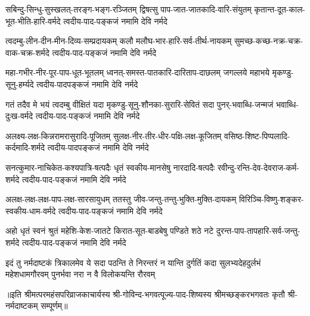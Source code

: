 
\fourlineindentedshloka
{सबिन्दु-सिन्धु-सुस्खलत्-तरङ्ग-भङ्ग-रञ्जितम्}
{द्विषत्सु पाप-जात-जातकादि-वारि-संयुतम्}
{कृतान्त-दूत-काल-भूत-भीति-हारि-वर्मदे}
{त्वदीय-पाद-पङ्कजं नमामि देवि नर्मदे} %

\fourlineindentedshloka
{त्वदम्बु-लीन-दीन-मीन-दिव्य-सम्प्रदायकम्}
{कलौ मलौघ-भार-हारि-सर्व-तीर्थ-नायकम्}
{सुमच्छ-कच्छ-नक्र-चक्र-वाक-चक्र-शर्मदे}
{त्वदीय-पाद-पङ्कजं नमामि देवि नर्मदे} %

\fourlineindentedshloka
{महा-गभीर-नीर-पूर-पाप-धूत-भूतलम्}
{ध्वनत्-समस्त-पातकारि-दारिताप-दाछलम्}
{जगल्लये महाभये मृकण्डु-सूनु-हर्म्यदे}
{त्वदीय-पादपङ्कजं नमामि देवि नर्मदे} %

\fourlineindentedshloka
{गतं तदैव मे भयं त्वदम्बु वीक्षितं यदा}
{मृकण्डु-सूनु-शौनका-सुरारि-सेवितं सदा}
{पुनर्-भवाब्धि-जन्मजं भवाब्धि-दुःख-वर्मदे}
{त्वदीय-पाद-पङ्कजं नमामि देवि नर्मदे} %

\fourlineindentedshloka
{अलक्ष्य-लक्ष-किन्नरामरासुरादि-पूजितम्}
{सुलक्ष-नीर-तीर-धीर-पक्षि-लक्ष-कूजितम्}
{वसिष्ठ-शिष्ट-पिप्पलादि-कर्दमादि-शर्मदे}
{त्वदीय-पादपङ्कजं नमामि देवि नर्मदे} %

\fourlineindentedshloka
{सनत्कुमार-नाचिकेत-कश्यपात्रि-षत्पदैः}
{धृतं स्वकीय-मानसेषु नारदादि-षत्पदैः}
{रवीन्दु-रन्ति-देव-देवराज-कर्म-शर्मदे}
{त्वदीय-पाद-पङ्कजं नमामि देवि नर्मदे} %

\fourlineindentedshloka
{अलक्ष-लक्ष-लक्ष-पाप-लक्ष-सारसायुधम्}
{ततस्तु जीव-जन्तु-तन्तु-भुक्ति-मुक्ति-दायकम्}
{विरिञ्चि-विष्णु-शङ्कर-स्वकीय-धाम-वर्मदे}
{त्वदीय-पाद-पङ्कजं नमामि देवि नर्मदे} %

\fourlineindentedshloka
{अहो धृतं स्वनं श्रुतं महेशि-केश-जातटे}
{किरात-सूत-बाडबेषु पण्डिते शठे नटे}
{दुरन्त-पाप-तापहारि-सर्व-जन्तु-शर्मदे}
{त्वदीय-पाद-पङ्कजं नमामि देवि नर्मदे} %

\fourlineindentedshloka
{इदं तु नर्मदाष्टकं त्रिकालमेव ये सदा}
{पठन्ति ते निरन्तरं न यान्ति दुर्गतिं कदा}
{सुलभ्यदेहदुर्लभं महेशधामगौरवम्}
{पुनर्भवा नरा न वै विलोकयन्ति रौरवम्} %

॥इति श्रीमत्परमहंसपरिव्राजकाचार्यस्य श्री-गोविन्द-भगवत्पूज्य-पाद-शिष्यस्य
श्रीमच्छङ्करभगवतः कृतौ श्री-नर्मदाष्टकम् सम्पूर्णम्॥